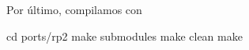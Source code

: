 \newpage
Por último, compilamos con 
\begin{multicli}
  \cliarrow cd ports/rp2 \newline
  \cliarrow make submodules \newline
  \cliarrow make clean \newline
  \cliarrow make
\end{multicli}
